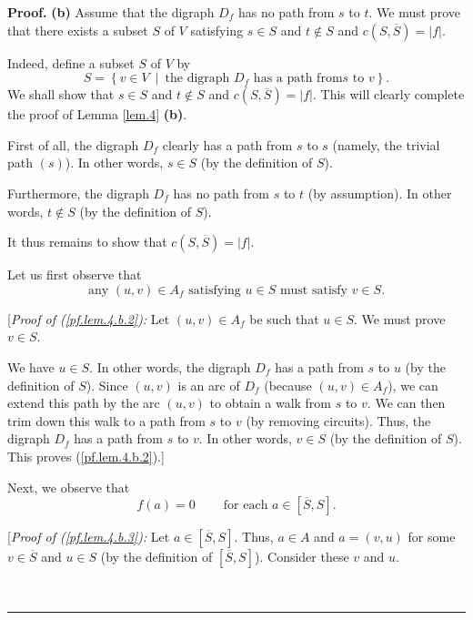 \documentclass[numbers=enddot,12pt,final,onecolumn,notitlepage]{scrartcl}%
\theoremstyle{definition}
\newenvironment{proof}[1][Proof]{\noindent\textbf{#1.} }{\ \rule{0.5em}{0.5em}}
\begin{document}
\begin{proof}
\textbf{(b)} Assume that the digraph $D_{f}$ has no path from $s$ to $t$. We
must prove that there exists a subset $S$ of $V$ satisfying $s\in S$ and
$t\notin S$ and $c\left(  S,\overline{S}\right)  =\left\vert f\right\vert $.

Indeed, define a subset $S$ of $V$ by%
\[
S=\left\{  v\in V\ \mid\ \text{the digraph }D_{f}\text{ has a path from
}s\text{ to }v\right\}  .
\]
We shall show that $s\in S$ and $t\notin S$ and $c\left(  S,\overline
{S}\right)  =\left\vert f\right\vert $. This will clearly complete the proof
of Lemma \ref{lem.4} \textbf{(b)}.

First of all, the digraph $D_{f}$ clearly has a path from $s$ to $s$ (namely,
the trivial path $\left(  s\right)  $). In other words, $s\in S$ (by the
definition of $S$).

Furthermore, the digraph $D_{f}$ has no path from $s$ to $t$ (by assumption).
In other words, $t\notin S$ (by the definition of $S$).

It thus remains to show that $c\left(  S,\overline{S}\right)  =
\left\vert f\right\vert$.

Let us first observe that%
\begin{equation}
\text{any }\left(  u,v\right)  \in A_{f}\text{ satisfying }u\in S\text{ must
satisfy }v\in S. \label{pf.lem.4.b.2}%
\end{equation}


[\textit{Proof of (\ref{pf.lem.4.b.2}):} Let $\left(  u,v\right)  \in A_{f}$
be such that $u\in S$. We must prove $v\in S$.

We have $u\in S$. In other words, the digraph $D_{f}$ has a path from $s$ to
$u$ (by the definition of $S$). Since $\left(  u,v\right)  $ is an arc of
$D_{f}$ (because $\left(  u,v\right)  \in A_{f}$), we can extend this path by
the arc $\left(  u,v\right)  $ to obtain a walk from $s$ to $v$. We can then
trim down this walk to a path from $s$ to $v$ (by removing circuits). Thus,
the digraph $D_{f}$ has a path from $s$ to $v$. In other words, $v\in S$ (by
the definition of $S$). This proves (\ref{pf.lem.4.b.2}).]

Next, we observe that%
\begin{equation}
f\left(  a\right)  =0\ \ \ \ \ \ \ \ \ \ \text{for each }a\in\left[
\overline{S},S\right]  . \label{pf.lem.4.b.3}%
\end{equation}


[\textit{Proof of (\ref{pf.lem.4.b.3}):} Let $a\in\left[  \overline
{S},S\right]  $. Thus, $a\in A$ and $a=\left(  v,u\right)  $ for some
$v\in\overline{S}$ and $u\in S$ (by the definition of $\left[  \overline
{S},S\right]  $). Consider these $v$ and $u$.


\end{proof}
\end{document}
